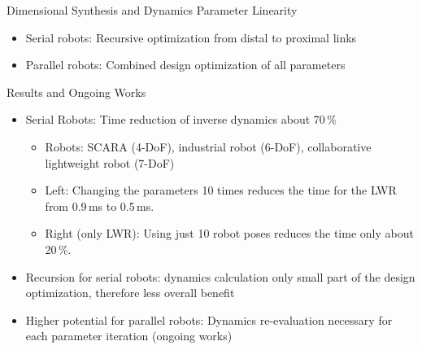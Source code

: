 \documentclass[c]{beamer}
\begin{document}
\begin{frame}
\begin{whiteblock}{Dimensional Synthesis and Dynamics Parameter Linearity}
{\begin{multicols}{2}
\begin{itemize}
\begin{itemize}
    \end{itemize}
    \item Serial robots: Recursive optimization from distal to proximal links
    \item Parallel robots: Combined design optimization of all parameters
\end{itemize}
\begin{figure}[t]
    \centering
    
\end{figure}

\end{multicols}}
\end{whiteblock}
\begin{block}{Results and Ongoing Works}
\parbox{\columnwidth}{
\begin{multicols}{2}
[]
\begin{itemize}
    \item Serial Robots: Time reduction of inverse dynamics about 70\,\%
    \begin{itemize}
        \item Robots: SCARA (4-DoF), industrial robot (6-DoF), collaborative lightweight robot (7-DoF)
        \item Left: Changing the parameters 10 times reduces the time for the LWR from 0.9\,ms to 0.5\,ms.
        \item Right (only LWR): Using just 10 robot poses reduces the time only about 20\,\%.
    \end{itemize}
    \item Recursion for serial robots: dynamics calculation only small part of the design optimization, therefore less overall benefit 
    \item Higher potential for parallel robots: Dynamics re-evaluation necessary for each parameter iteration (ongoing works)
\end{itemize}


\end{multicols}}
\end{block}
\end{frame}
\end{document}
